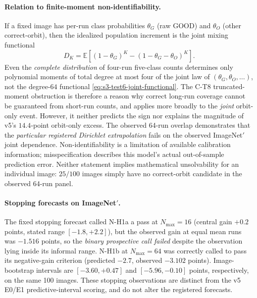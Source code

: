 \paragraph{Relation to finite-moment non-identifiability.}
If a fixed image has per-run class probabilities
$\theta_G$ (raw GOOD) and
$\theta_O$ (other correct-orbit), then the
idealized population increment is the joint
mixing functional
\begin{equation}\label{eq:s3-test6-joint-functional}
 D_K=\mathbb E\!\left[
 (1-\theta_G)^K-
 (1-\theta_G-\theta_O)^K
 \right].
\end{equation}
Even the \emph{complete distribution} of
four-run five-class counts determines only
polynomial moments of total degree at most four
of the joint law of $(\theta_G,\theta_O,\ldots)$,
not the degree-$64$ functional
\eqref{eq:s3-test6-joint-functional}.
The C-T8 truncated-moment obstruction is
therefore a reason why correct long-run
coverage cannot be guaranteed from short-run
counts, and applies more broadly to the
\emph{joint} orbit-only event.
However, it neither predicts the sign nor
explains the magnitude of v5's $14.4$-point
orbit-only excess. The observed 64-run overlap demonstrates
that the \emph{particular registered Dirichlet
extrapolation} fails on the observed ImageNet$'$ joint dependence. Non-identifiability is a
limitation of available calibration information;
misspecification describes this model's
actual out-of-sample prediction error.
Neither statement implies mathematical
unsolvability for an individual image:
$25/100$ images simply have no correct-orbit
candidate in the observed 64-run panel.

\paragraph{Stopping forecasts on ImageNet$'$.}
The fixed stopping forecast
called N-H1a a pass at $N_{\max}=16$
(central gain $+0.2$ points, stated range
$[-1.8,+2.2]$), but the observed
gain at equal mean runs was $-1.516$ points,
so the \emph{binary prospective call failed}
despite the observation lying inside its
informal range.
N-H1b at $N_{\max}=64$ was correctly called
to pass its negative-gain criterion
(predicted $-2.7$, observed $-3.102$ points).
Image-bootstrap intervals are
$[-3.60,+0.47]$ and $[-5.96,-0.10]$
points, respectively, on the same 100 images.
These stopping observations are distinct from
the v5 E0/E1 predictive-interval scoring,
and do not alter the registered forecasts.
